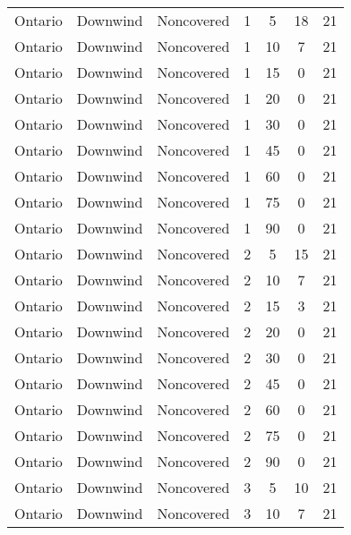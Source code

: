 \documentclass{article}
\begin{document}
\begin{longtable}[c]{ccccccc}
Ontario   & Downwind  & Noncovered & 1               & 5            & 18          & 21  \\
Ontario   & Downwind  & Noncovered & 1               & 10           & 7           & 21  \\
Ontario   & Downwind  & Noncovered & 1               & 15           & 0           & 21  \\
Ontario   & Downwind  & Noncovered & 1               & 20           & 0           & 21  \\
Ontario   & Downwind  & Noncovered & 1               & 30           & 0           & 21  \\
Ontario   & Downwind  & Noncovered & 1               & 45           & 0           & 21  \\
Ontario   & Downwind  & Noncovered & 1               & 60           & 0           & 21  \\
Ontario   & Downwind  & Noncovered & 1               & 75           & 0           & 21  \\
Ontario   & Downwind  & Noncovered & 1               & 90           & 0           & 21  \\
Ontario   & Downwind  & Noncovered & 2               & 5            & 15          & 21  \\
Ontario   & Downwind  & Noncovered & 2               & 10           & 7           & 21  \\
Ontario   & Downwind  & Noncovered & 2               & 15           & 3           & 21  \\
Ontario   & Downwind  & Noncovered & 2               & 20           & 0           & 21  \\
Ontario   & Downwind  & Noncovered & 2               & 30           & 0           & 21  \\
Ontario   & Downwind  & Noncovered & 2               & 45           & 0           & 21  \\
Ontario   & Downwind  & Noncovered & 2               & 60           & 0           & 21  \\
Ontario   & Downwind  & Noncovered & 2               & 75           & 0           & 21  \\
Ontario   & Downwind  & Noncovered & 2               & 90           & 0           & 21  \\
Ontario   & Downwind  & Noncovered & 3               & 5            & 10          & 21  \\
Ontario   & Downwind  & Noncovered & 3               & 10           & 7           & 21  \\

\end{longtable}
\end{document}

